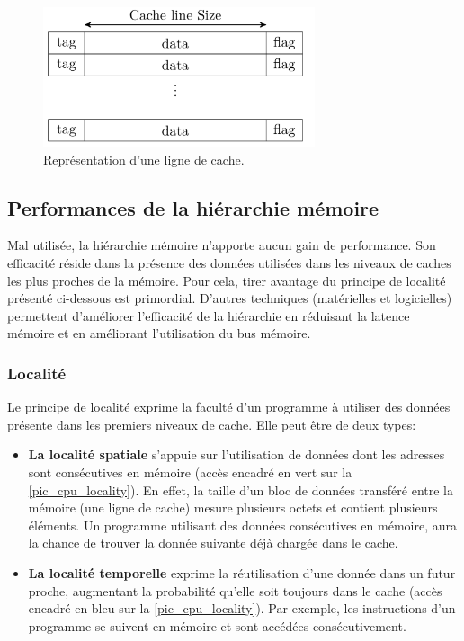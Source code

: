 \begin{figure}
    \center
    \includegraphics[width=8cm]{images/cacheline_def.png}
    \caption{\label{pic:cacheline} Représentation d'une ligne de cache.}
\end{figure}


\subsection{Performances de la hiérarchie mémoire}
Mal utilisée, la hiérarchie mémoire n'apporte aucun gain de performance. Son efficacité réside dans la présence des données utilisées dans les niveaux de caches les plus proches de la mémoire. Pour cela, tirer avantage du principe de localité présenté ci-dessous est primordial. D'autres techniques (matérielles et logicielles) permettent d'améliorer l'efficacité de la hiérarchie en réduisant la latence mémoire et en améliorant l'utilisation du bus mémoire. 


\subsubsection{Localité}\label{sec:locality}
Le principe de localité exprime la faculté d'un programme à utiliser des données présente dans les premiers niveaux de cache. Elle peut être de deux types:
\begin{itemize}
    \item \textbf{La localité spatiale} s'appuie sur l'utilisation de données dont les adresses sont consécutives en mémoire (accès encadré en vert sur la \autoref{pic_cpu_locality}). En effet, la taille d'un bloc de données transféré entre la mémoire (une ligne de cache) mesure plusieurs octets et contient plusieurs éléments. Un programme utilisant des données consécutives en mémoire, aura la chance de trouver la donnée suivante déjà chargée dans le cache. 
    \item \textbf{La localité temporelle} exprime la réutilisation d'une donnée dans un futur proche, augmentant la probabilité qu'elle soit toujours dans le cache (accès encadré en bleu sur la \autoref{pic_cpu_locality}). Par exemple, les instructions d'un programme se suivent en mémoire et sont accédées consécutivement. 

\end{itemize}

